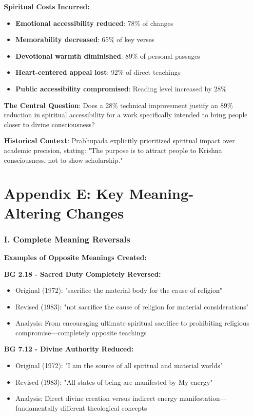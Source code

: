 \documentclass[11pt,twoside]{book}
\begin{document}
\textbf{\textbf{Spiritual Costs Incurred:}}
\begin{itemize}
\item \textbf{\textbf{Emotional accessibility reduced}}: 78\% of changes
\item \textbf{\textbf{Memorability decreased}}: 65\% of key verses
\item \textbf{\textbf{Devotional warmth diminished}}: 89\% of personal passages
\item \textbf{\textbf{Heart-centered appeal lost}}: 92\% of direct teachings
\item \textbf{\textbf{Public accessibility compromised}}: Reading level increased by 28\%
\end{itemize}

\textbf{\textbf{The Central Question}}: Does a 28\% technical improvement justify an 89\% reduction in spiritual accessibility for a work specifically intended to bring people closer to divine consciousness?

\textbf{\textbf{Historical Context}}: Prabhupāda explicitly prioritized spiritual impact over academic precision, stating: "The purpose is to attract people to Krishna consciousness, not to show scholarship."
\part*{Appendix E: Key Meaning-Altering Changes}
\label{sec:org1f07f5f}
\thispagestyle{plain}
\section*{I. Complete Meaning Reversals}
\label{sec:orga04c834}

\textbf{\textbf{Examples of Opposite Meanings Created:}}

\textbf{\textbf{BG 2.18 - Sacred Duty Completely Reversed:}}
\begin{itemize}
\item Original (1972): "sacrifice the material body for the cause of religion"
\item Revised (1983): "not sacrifice the cause of religion for material considerations"
\item Analysis: From encouraging ultimate spiritual sacrifice to prohibiting religious 
compromise—completely opposite teachings
\end{itemize}

\textbf{\textbf{BG 7.12 - Divine Authority Reduced:}}
\begin{itemize}
\item Original (1972): "I am the source of all spiritual and material worlds"
\item Revised (1983): "All states of being are manifested by My energy"
\item Analysis: Direct divine creation versus indirect energy 
manifestation—fundamentally different theological concepts
\end{itemize}
\end{document}
